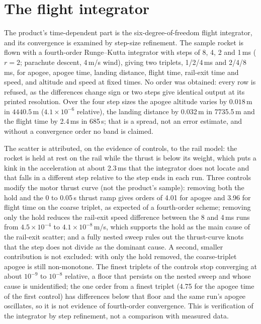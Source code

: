 \documentclass[twocolumn]{labreport}
\begin{document}
\section{The flight integrator}
\label{sec:temporalapp}

The product's time-dependent part is the six-degree-of-freedom flight integrator, and its convergence is examined by step-size refinement.
The sample rocket is flown with a fourth-order Runge--Kutta integrator with steps of 8, 4, 2 and 1\,ms ($r=2$; parachute descent, 4\,m/s wind), giving two triplets, 1/2/4\,ms and 2/4/8\,ms, for apogee, apogee time, landing distance, flight time, rail-exit time and speed, and altitude and speed at fixed times.
No order was obtained: every row is refused, as the differences change sign or two steps give identical output at its printed resolution.
Over the four step sizes the apogee altitude varies by $0.018$\,m in $4440.5$\,m ($4.1\times10^{-6}$ relative), the landing distance by 0.032\,m in 7735.5\,m and the flight time by 2.4\,ms in 685\,s; that is a spread, not an error estimate, and without a convergence order no band is claimed.

The scatter is attributed, on the evidence of controls, to the rail model: the rocket is held at rest on the rail while the thrust is below its weight, which puts a kink in the acceleration at about 2.3\,ms that the integrator does not locate and that falls in a different step relative to the step ends in each run.
Three controls modify the motor thrust curve (not the product's sample): removing both the hold and the 0 to 0.05\,s thrust ramp gives orders of 4.01 for apogee and 3.96 for flight time on the coarse triplet, as expected of a fourth-order scheme; removing only the hold reduces the rail-exit speed difference between the 8 and 4\,ms runs from $4.5\times10^{-4}$ to $4.1\times10^{-8}$\,m/s, which supports the hold as the main cause of the rail-exit scatter; and a fully nested sweep rules out the thrust-curve knots that the step does not divide as the dominant cause.
A second, smaller contribution is not excluded: with only the hold removed, the coarse-triplet apogee is still non-monotone.
The finest triplets of the controls stop converging at about $10^{-9}$ to $10^{-8}$ relative, a floor that persists on the nested sweep and whose cause is unidentified; the one order from a finest triplet (4.75 for the apogee time of the first control) has differences below that floor and the same run's apogee oscillates, so it is not evidence of fourth-order convergence.
This is verification of the integrator by step refinement, not a comparison with measured data.
\end{document}

